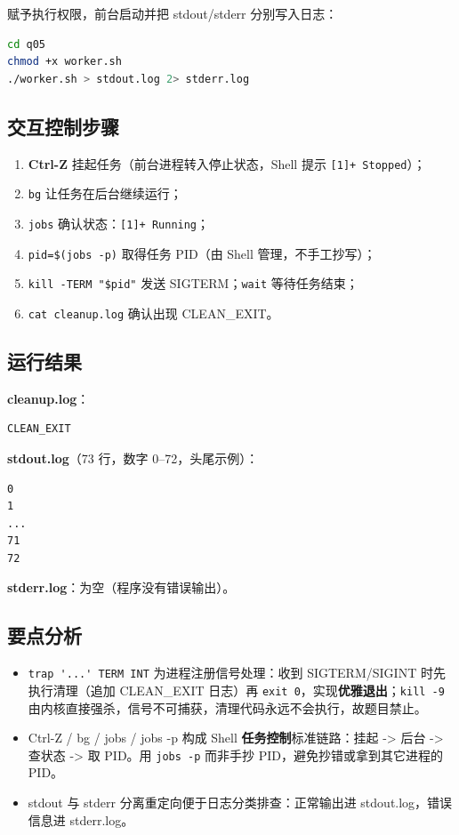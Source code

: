 \documentclass[UTF8,fontset=ubuntu]{ctexart}
\begin{document}
赋予执行权限，前台启动并把 stdout/stderr 分别写入日志：
\begin{lstlisting}[language=bash]
cd q05
chmod +x worker.sh
./worker.sh > stdout.log 2> stderr.log
\end{lstlisting}

\subsection{交互控制步骤}
\begin{enumerate}
\item \textbf{Ctrl-Z} 挂起任务（前台进程转入停止状态，Shell 提示 \lstinline|[1]+ Stopped|）；
\item \lstinline|bg| 让任务在后台继续运行；
\item \lstinline|jobs| 确认状态：\lstinline|[1]+ Running|；
\item \lstinline|pid=$(jobs -p)| 取得任务 PID（由 Shell 管理，不手工抄写）；
\item \lstinline|kill -TERM "$pid"| 发送 SIGTERM；\lstinline|wait| 等待任务结束；
\item \lstinline|cat cleanup.log| 确认出现 CLEAN\_EXIT。
\end{enumerate}

\subsection{运行结果}
\textbf{cleanup.log}：
\begin{lstlisting}
CLEAN_EXIT
\end{lstlisting}

\textbf{stdout.log}（73 行，数字 0--72，头尾示例）：
\begin{lstlisting}
0
1
...
71
72
\end{lstlisting}

\textbf{stderr.log}：为空（程序没有错误输出）。

\subsection{要点分析}
\begin{itemize}
\item \lstinline|trap '...' TERM INT| 为进程注册信号处理：收到 SIGTERM/SIGINT 时先执行清理（追加 CLEAN\_EXIT 日志）再 \lstinline|exit 0|，实现\textbf{优雅退出}；\lstinline|kill -9| 由内核直接强杀，信号不可捕获，清理代码永远不会执行，故题目禁止。
\item Ctrl-Z / bg / jobs / jobs -p 构成 Shell \textbf{任务控制}标准链路：挂起 -> 后台 -> 查状态 -> 取 PID。用 \lstinline|jobs -p| 而非手抄 PID，避免抄错或拿到其它进程的 PID。
\item stdout 与 stderr 分离重定向便于日志分类排查：正常输出进 stdout.log，错误信息进 stderr.log。
\end{itemize}
\end{document}
